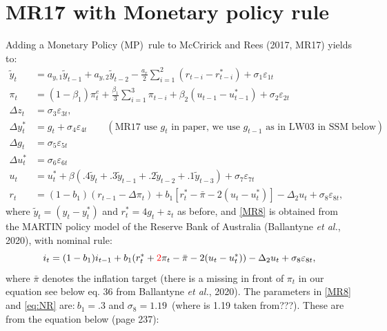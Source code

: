 \documentclass[a4paper,12pt]{article}
\begin{document}
\section{MR17 with Monetary policy rule}

Adding a Monetary Policy (MP)\ rule to McCririck and Rees (2017, MR17)
yields to:%
\begin{align}
\tilde{y}_{t}& =a_{y,1}\tilde{y}_{t-1}+a_{y,2}\tilde{y}_{t-2}-\frac{a_{r}}{2}%
\sum_{i=1}^{2}(r_{t-i}-r_{t-i}^{\ast })+\sigma _{1}\varepsilon _{1t}
\label{MR1} \\
\pi _{t}& =(1-\beta _{1})\pi _{t}^{e}+\frac{\beta _{1}}{3}\sum_{i=1}^{3}\pi
_{t-i}+\beta _{2}(u_{t-1}-u_{t-1}^{\ast })+\sigma _{2}\varepsilon _{2t}
\label{MR2} \\
\Delta z_{t}& =\sigma _{3}\varepsilon _{3t},  \label{MR3} \\
\Delta y_{t}^{\ast }& =g_{t}+\sigma _{4}\varepsilon _{4t}\qquad (\text{MR17
use }g_{t}\text{ in paper, we use }g_{t-1}\text{ as in LW03 in SSM below})
\label{MR4} \\
\Delta g_{t}& =\sigma _{5}\varepsilon _{5t}  \label{MR5} \\
\Delta u_{t}^{\ast }& =\sigma _{6}\varepsilon _{6t}  \label{MR6} \\
u_{t}& =u_{t}^{\ast }+\beta (.4\tilde{y}_{t}+.3\tilde{y}_{t-1}+.2\tilde{y}%
_{t-2}+.1\tilde{y}_{t-3})+\sigma _{7}\varepsilon _{7t}  \label{MR7} \\
r_{t}& =(1-b_{1})(r_{t-1}-\Delta \pi _{t})+b_{1}\left[ r_{t}^{\ast }-\bar{\pi%
}-2(u_{t}-u_{t}^{\ast })\right] -\Delta _{2}u_{t}+\sigma _{8}\varepsilon
_{8t},  \label{MR8}
\end{align}%
where $\tilde{y}_{t}=(y_{t}-y_{t}^{\ast })$ and $r_{t}^{\ast }=4g_{t}+z_{t}$
as before, and \ref{MR8} is obtained from the MARTIN policy model of the
Reserve Bank of Australia (Ballantyne \emph{et al.}, 2020), with nominal
rule:%
\begin{equation}
i_{t}=(1-b_{1})i_{t-1}+b_{1}(r_{t}^{\ast }+{\color{red}{2}}\pi _{t}-\bar{\pi}%
-2(u_{t}-u_{t}^{\ast }))-\Delta _{2}u_{t}+\sigma _{8}\varepsilon _{8t},
\label{eq:NR}
\end{equation}%
where $\bar{\pi}$ denotes the inflation target (there is a {\color{red}{2}}
missing in front of $\pi _{t}$ in our equation see below eq. 36 from
Ballantyne \emph{et al.}, 2020). The parameters in \ref{MR8} and \ref{eq:NR}
are:$\ b_{1}=.3$ and $\sigma _{8}=1.19$\ (where is 1.19 taken from???).
These are from the equation below (page 237):
\end{document}

